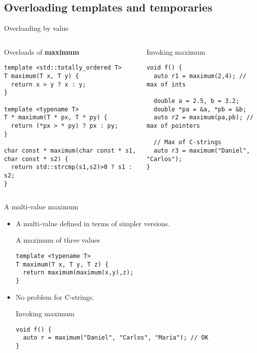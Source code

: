 \subsection{Overloading templates and temporaries}

\begin{frame}[t,fragile]{Overloading by value}

\begin{columns}[T]

\begin{block}{Overloads of \textbf{maximum}}
\begin{lstlisting}
template <std::totally_ordered T>
T maximum(T x, T y) {
  return x > y ? x : y;
}

template <typename T>
T * maximum(T * px, T * py) {
  return (*px > * py) ? px : py;
}

char const * maximum(char const * s1, char const * s2) {
  return std::strcmp(s1,s2)>0 ? s1 : s2;
}
\end{lstlisting}
\end{block}

\pause
{}
\begin{block}{Invoking maximum}
\begin{lstlisting}
void f() {
  auto r1 = maximum(2,4); // max of ints

  double a = 2.5, b = 3.2;
  double *pa = &a, *pb = &b;
  auto r2 = maximum(pa,pb); // max of pointers

  // Max of C-strings
  auto r3 = maximum("Daniel", "Carlos");
}
\end{lstlisting}
\end{block}

\end{columns}
\end{frame}

\begin{frame}[t,fragile]{A multi-value maximum}
\begin{itemize}
  \item A multi-value  defined in terms of simpler versions.

\begin{block}{A maximum of three values}
\begin{lstlisting}
template <typename T>
T maximum(T x, T y, T z) {
  return maximum(maximum(x,y),z);
}
\end{lstlisting}
\end{block}

  \item No problem for C-strings.

\begin{block}{Invoking maximum}
\begin{lstlisting}
void f() {
  auto r = maximum("Daniel", "Carlos", "Maria"); // OK
}
\end{lstlisting}
\end{block}

\end{itemize}
\end{frame}

